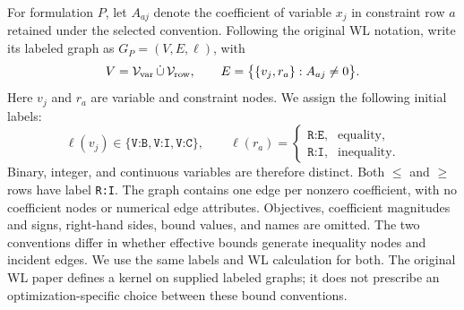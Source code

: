\documentclass[11pt]{article}
\begin{document}
\begin{enumerate}[label=(AssoE.\arabic*),leftmargin=*]
For formulation $P$, let $A_{aj}$ denote the coefficient of variable
$x_j$ in constraint row $a$ retained under the selected convention.
Following the original WL
notation, write its labeled graph as $G_P=(V,E,\ell)$, with
\[
 V=\mathcal V_{\rm var}\,\dot\cup\,\mathcal V_{\rm row},
 \qquad
 E=\big\{\{v_j,r_a\}:A_{aj}\ne0\big\}.
\]
Here $v_j$ and $r_a$ are variable and constraint nodes. We assign the
following initial labels:
\[
\ell(v_j)\in
\{\texttt{V:B},\texttt{V:I},\texttt{V:C}\},\qquad
\ell(r_a)=
\begin{cases}
 \texttt{R:E},&\text{equality},\\
 \texttt{R:I},&\text{inequality}.
\end{cases}
\]
Binary, integer, and continuous variables are therefore distinct.
Both $\leq$ and $\geq$ rows have label \texttt{R:I}.
The graph contains one edge per nonzero coefficient, with no coefficient
nodes or numerical edge attributes. Objectives, coefficient magnitudes
and signs, right-hand sides, bound values, and names are omitted.
The two conventions differ in whether effective bounds generate
inequality nodes and incident edges. We use the same labels and WL
calculation for both. The original WL paper defines a kernel on supplied
labeled graphs; it does not prescribe an optimization-specific choice
between these bound conventions.


\end{enumerate}
\end{document}

